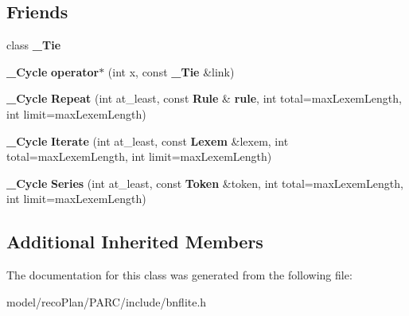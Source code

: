 \subsection*{Friends}
\begin{DoxyCompactItemize}
\item 
\mbox{\label{classbnf_1_1___cycle_ab555bd08f573aad86ad95feb76007c15}} 
class {\bfseries \+\_\+\+Tie}
\item 
\mbox{\label{classbnf_1_1___cycle_a42c2b33ba506a4cf0d9c52e320e471ae}} 
\textbf{ \+\_\+\+Cycle} {\bfseries operator$\ast$} (int x, const \textbf{ \+\_\+\+Tie} \&link)
\item 
\mbox{\label{classbnf_1_1___cycle_a8f5b6bfc935f03ffd6af67c00ed3c27e}} 
\textbf{ \+\_\+\+Cycle} {\bfseries Repeat} (int at\+\_\+least, const \textbf{ Rule} \&\textbf{ rule}, int total=max\+Lexem\+Length, int limit=max\+Lexem\+Length)
\item 
\mbox{\label{classbnf_1_1___cycle_a35464540445f3163727003daeebb8904}} 
\textbf{ \+\_\+\+Cycle} {\bfseries Iterate} (int at\+\_\+least, const \textbf{ Lexem} \&lexem, int total=max\+Lexem\+Length, int limit=max\+Lexem\+Length)
\item 
\mbox{\label{classbnf_1_1___cycle_a39253986f40d82c4455593c7afc3e426}} 
\textbf{ \+\_\+\+Cycle} {\bfseries Series} (int at\+\_\+least, const \textbf{ Token} \&token, int total=max\+Lexem\+Length, int limit=max\+Lexem\+Length)
\end{DoxyCompactItemize}
\subsection*{Additional Inherited Members}


The documentation for this class was generated from the following file\+:\begin{DoxyCompactItemize}
\item 
model/reco\+Plan/\+P\+A\+R\+C/include/bnflite.\+h\end{DoxyCompactItemize}
